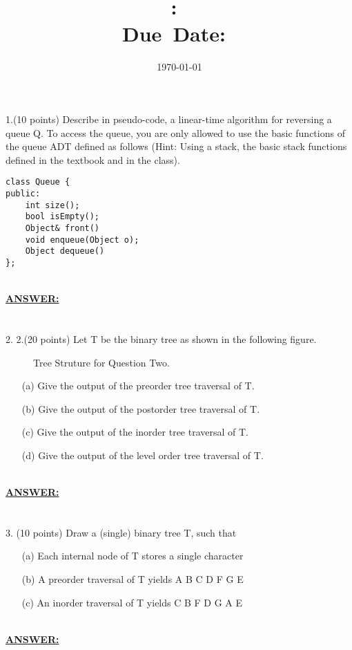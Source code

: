 \documentclass{article}
\title{\textmd{\textbf{\hmwkClass:\
      \hmwkTitle}}\\\normalsize\small{Due\ Date:\
    \hmwkDueDate}\\}
\date{\today}
\author{\textbf{\hmwkAuthorName}}
\newcommand{\answer}{\textbf{\\\underline{ANSWER:}\\}}
\begin{document}
\maketitle

\section*{}
1.(10 points) Describe in pseudo-code, a linear-time algorithm for
reversing a queue Q. To access the queue, you are only allowed to use
the basic functions of the queue ADT defined as follows (Hint: Using a
stack, the basic stack functions defined in the textbook and in the
class). 

\begin{lstlisting}
class Queue {
public:
    int size();
    bool isEmpty();
    Object& front()
    void enqueue(Object o);
    Object dequeue()
};
\end{lstlisting}
\answer

\section*{}
2. 2.(20 points) Let T be the binary tree as shown in the following
figure.\\

\begin{figure}[htb]
  \begin{center}
    \caption{Tree Struture for Question Two.}
  \end{center}
\end{figure}

\begin{enumerate}
\item[(a)]Give the output of the preorder tree traversal of T. 
\item[(b)]Give the output of the postorder tree traversal of T.
\item[(c)]Give the output of the inorder tree traversal of T.
\item[(d)]Give the output of the level order tree traversal of T.
\end{enumerate}
\answer

\section*{}
3. (10 points) Draw a (single) binary tree T, such that
\begin{enumerate}
\item[(a)]Each internal node of T stores a single character
\item[(b)]A preorder traversal of T yields A B C D F G E
\item[(c)]An inorder traversal of T yields C B F D G A E
\end{enumerate}
\answer
\end{document}
